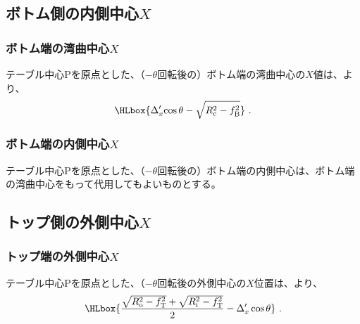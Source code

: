 \subsection{ボトム側の内側中心\texorpdfstring{$X$}{X}}

\subsubsection{ボトム端の湾曲中心\texorpdfstring{$X$}{X}}
テーブル中心Pを原点とした、（$-\theta$回転後の）ボトム端の湾曲中心の$X$値は、より、
\begin{align*}
  \HLbox{\Delta_x'\!\cos\theta-\sqrt{R_\mathrm c^2-f_\mathrm B^2}}~.
\end{align*}

\subsubsection{ボトム端の内側中心\texorpdfstring{$X$}{X}}
テーブル中心Pを原点とした、（$-\theta$回転後の）ボトム端の内側中心は、ボトム端の湾曲中心をもって代用してもよいものとする。


\clearpage
\subsection{トップ側の外側中心\texorpdfstring{$X$}{X}}

\subsubsection{トップ端の外側中心\texorpdfstring{$X$}{X}}
テーブル中心Pを原点とした、（$-\theta$回転後の外側中心の$X$位置は、より、
\begin{align*}
  \HLbox{%
    \frac{\sqrt{R_\mathrm o^2-f_\mathrm T^2}+\sqrt{R_\mathrm i^2-f_\mathrm T^2}}2-\Delta_x'\cos\theta%
  }~.
\end{align*}

